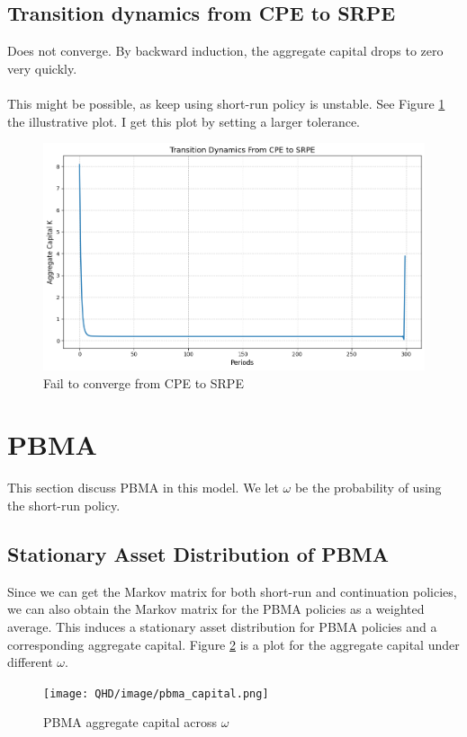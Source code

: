\documentclass[11pt,a4paper]{article}
\begin{document}
\subsection{Transition dynamics from CPE to SRPE}
Does not converge. By backward induction, the aggregate capital drops to zero very quickly.\\
\\
This might be possible, as keep using short-run policy is unstable.  See Figure \ref{fig:CPE_to_SRPE} the illustrative plot. I get this plot by setting a larger tolerance.
\begin{figure}[h!]
    \centering
    \includegraphics[width=1\linewidth]{QHD/image/CPE_to_SRPE.png}
    \caption{Fail to converge from CPE to SRPE}
    \label{fig:CPE_to_SRPE}
\end{figure}
\newpage
\section{PBMA}\label{sec:pbma}
This section discuss PBMA in this model. We let $\omega$ be the probability of using the short-run policy.
\subsection{Stationary Asset Distribution of PBMA}
Since we can get the Markov matrix for both short-run and continuation policies, we can also obtain the Markov matrix for the PBMA policies as a weighted average. This induces a stationary asset distribution for PBMA policies and a corresponding aggregate capital. Figure \ref{fig:PBMA different omega} is a plot for the aggregate capital under different $\omega$.
\begin{figure}[h!]
    \centering
    \texttt{[image: QHD/image/pbma\_capital.png]}
    \caption{PBMA aggregate capital across $\omega$}
    \label{fig:PBMA different omega}
\end{figure}
\end{document}
